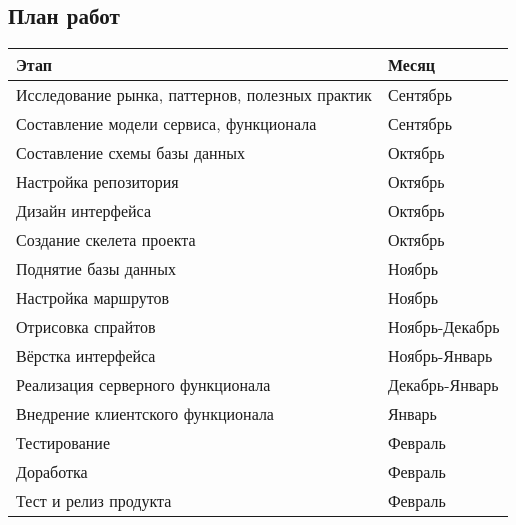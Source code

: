 \documentclass[../document.tex]{subfiles}
\begin{document}
\subsection{План работ}
\begin{tabular}{ | l | l | }
    \hline
    Этап                                            & Месяц          \\
    \hline
    Исследование рынка, паттернов, полезных практик & Сентябрь       \\
    \hline
    Составление модели сервиса, функционала         & Сентябрь       \\
    \hline
    Составление схемы базы данных                   & Октябрь        \\
    \hline
    Настройка репозитория                           & Октябрь        \\
    \hline
    Дизайн интерфейса                               & Октябрь        \\
    \hline
    Создание скелета проекта                        & Октябрь        \\
    \hline
    Поднятие базы данных                            & Ноябрь         \\
    \hline
    Настройка маршрутов                             & Ноябрь         \\
    \hline
    Отрисовка спрайтов                              & Ноябрь-Декабрь \\
    \hline
    Вёрстка интерфейса                              & Ноябрь-Январь  \\
    \hline
    Реализация серверного функционала               & Декабрь-Январь \\
    \hline
    Внедрение клиентского функционала               & Январь         \\
    \hline
    Тестирование                                    & Февраль        \\
    \hline
    Доработка                                       & Февраль        \\
    \hline
    Тест и релиз продукта                           & Февраль        \\
    \hline
\end{tabular}
\end{document}
